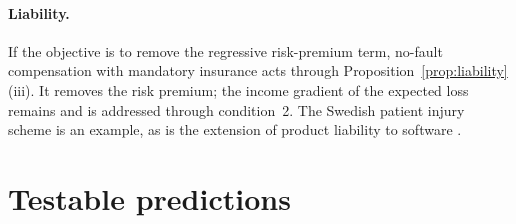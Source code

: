 \documentclass[12pt]{article}
\theoremstyle{remark}
\begin{document}
\paragraph{Liability.} If the objective is to remove the regressive risk-premium term, no-fault compensation with mandatory insurance acts through Proposition~\ref{prop:liability}(iii). It removes the risk premium; the income gradient of the expected loss remains and is addressed through condition~2. The Swedish patient injury scheme \citep{sweden1996patient} is an example, as is the extension of product liability to software \citep{eu2024pld}.

\section{Testable predictions}\label{sec:predictions}
\end{document}
